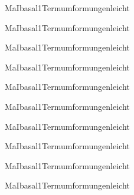 \documentclass[12pt]{article}
\begin{document}
    \begin{Add}{MaI}{basal1}{Termumformungen}{leicht}
    \solution{ }
    \end{Add}
    \begin{Add}{MaI}{basal1}{Termumformungen}{leicht}
    \end{Add}
    

   \begin{Add}{MaI}{basal1}{Termumformungen}{leicht}
   \solution{ }
   \end{Add}
   \begin{Add}{MaI}{basal1}{Termumformungen}{leicht}
   \end{Add}
   

   \begin{Add}{MaI}{basal1}{Termumformungen}{leicht}
   \solution{ }
   \end{Add}
   \begin{Add}{MaI}{basal1}{Termumformungen}{leicht}
   \end{Add}
   

   \begin{Add}{MaI}{basal1}{Termumformungen}{leicht}
   \solution{ }
   \end{Add}
   \begin{Add}{MaI}{basal1}{Termumformungen}{leicht}
   \end{Add}
   

   \begin{Add}{MaI}{basal1}{Termumformungen}{leicht}
   \solution{ }
   \end{Add}
   \begin{Add}{MaI}{basal1}{Termumformungen}{leicht}
   \end{Add}
   
\end{document}
